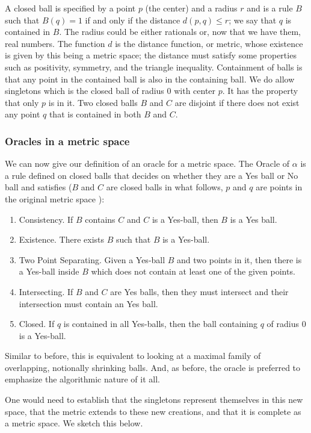 \documentclass[12pt]{article}
\theoremstyle{remark}
\begin{document}
A closed ball is specified by a point $p$ (the center) and a radius $r$ and is a rule $B$ such that $B(q) = 1$ if and only if the distance $d(p,q) \leq r$; we say that $q$ is contained in $B$. The radius could be either rationals or, now that we have them, real numbers. The function $d$ is the distance function, or metric, whose existence is given by this being a metric space; the distance must satisfy some properties such as positivity, symmetry, and the triangle inequality. Containment of balls is that any point in the contained ball is also in the containing ball. We do allow singletons which is the closed ball of radius $0$ with center $p$. It has the property that only $p$ is in it. Two closed balls $B$ and $C$ are disjoint if there does not exist any point $q$ that is contained in both $B$ and $C$.

\subsubsection{Oracles in a metric space}

We can now give our definition of an oracle for a metric space. The Oracle of $\alpha$ is a rule defined on closed balls that decides on whether they are a Yes ball or No ball and satisfies ($B$ and $C$ are closed balls in what follows, $p$ and $q$ are points in the original metric space ): 
\begin{enumerate}
    \item Consistency. If $B$ contains $C$ and $C$ is a Yes-ball, then $B$ is a Yes ball.
    \item Existence. There exists $B$ such that $B$ is a Yes-ball.
    \item Two Point Separating. Given a Yes-ball $B$ and two points in it, then there is a Yes-ball inside $B$ which does not contain at least one of the given points. 
    \item Intersecting. If $B$ and $C$ are Yes balls, then they must intersect and their intersection must contain an Yes ball.
    \item Closed. If $q$ is contained in all Yes-balls, then the ball containing $q$ of radius 0 is a Yes-ball. 
\end{enumerate}

Similar to before, this is equivalent to looking at a maximal family of overlapping, notionally shrinking balls. And, as before, the oracle is preferred to emphasize the algorithmic nature of it all. 

One would need to establish that the singletons represent themselves in this new space, that the metric extends to these new creations, and that it is complete as a metric space. We sketch this below.
\end{document}
